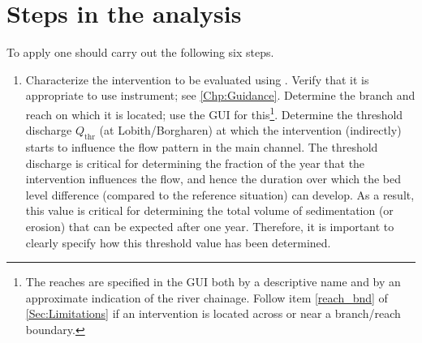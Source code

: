 \chapter{Steps in the analysis}\label{Chp:steps}

To apply \dfastmi one should carry out the following six steps.

\begin{enumerate}
\item Characterize the intervention to be evaluated using \dfmi.
Verify that it is appropriate to use \dfmi instrument; see \autoref{Chp:Guidance}.
Determine the branch and reach on which it is located; use the \dfmi GUI for this\footnote{The reaches are specified in the GUI both by a descriptive name and by an approximate indication of the river chainage.
Follow item \ref{reach_bnd} of \autoref{Sec:Limitations} if an intervention is located across or near a branch/reach boundary.}.
Determine the threshold discharge $Q_\text{thr}$ (at Lobith/Borgharen) at which the intervention (indirectly) starts to influence the flow pattern in the main channel.
The threshold discharge is critical for determining the fraction of the year that the intervention influences the flow, and hence the duration over which the bed level difference (compared to the reference situation) can develop.
As a result, this value is critical for determining the total volume of sedimentation (or erosion) that can be expected after one year.
Therefore, it is important to clearly specify how this threshold value has been determined.


\end{enumerate}

